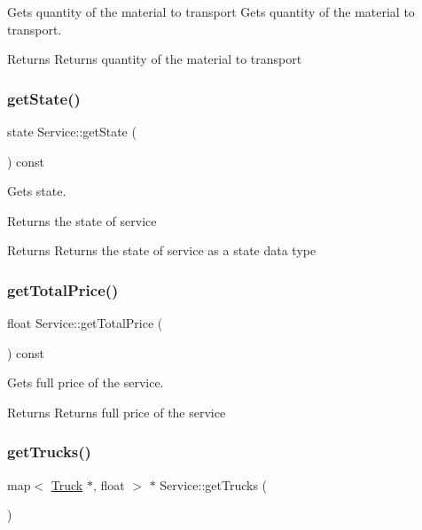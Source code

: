 Gets quantity of the material to transport Gets quantity of the material to transport. 

\begin{DoxyReturn}{Returns}
Returns quantity of the material to transport 
\end{DoxyReturn}
\mbox{\label{class_service_adf7f337e38c8de87e82b42f15c7ccad3}} 
\subsubsection{\texorpdfstring{get\+State()}{getState()}}
{\footnotesize\ttfamily state Service\+::get\+State (\begin{DoxyParamCaption}{ }\end{DoxyParamCaption}) const}



Gets state. 

Returns the state of service

\begin{DoxyReturn}{Returns}
Returns the state of service as a state data type 
\end{DoxyReturn}
\mbox{\label{class_service_ac5dca2c1b78ff990827554d4ac9c5990}} 
\subsubsection{\texorpdfstring{get\+Total\+Price()}{getTotalPrice()}}
{\footnotesize\ttfamily float Service\+::get\+Total\+Price (\begin{DoxyParamCaption}{ }\end{DoxyParamCaption}) const}



Gets full price of the service. 

\begin{DoxyReturn}{Returns}
Returns full price of the service 
\end{DoxyReturn}
\mbox{\label{class_service_a48898f98adbbaec9d3a1cbdfd88b2137}} 
\subsubsection{\texorpdfstring{get\+Trucks()}{getTrucks()}}
{\footnotesize\ttfamily map$<$ \hyperlink{class_truck}{Truck} $\ast$, float $>$ $\ast$ Service\+::get\+Trucks (\begin{DoxyParamCaption}{ }\end{DoxyParamCaption})}




